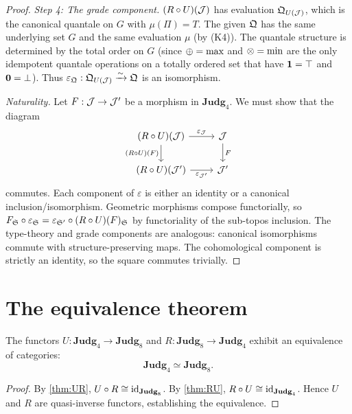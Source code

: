 \begin{proof}
\emph{Step 4: The grade component.}
$(R \circ U)(\mathcal{J})$ has evaluation $\mathfrak{Q}_{U(\mathcal{J})}$, which is the
canonical quantale on $G$ with $\mu(\Pi) = T$.  The given $\mathfrak{Q}$
has the same underlying set $G$ and the same evaluation $\mu$
(by (K4)).  The quantale structure is determined by the total
order on $G$ (since $\oplus = \max$ and $\otimes = \min$ are the only
idempotent quantale operations on a totally ordered set that have
$\mathbf{1} = \top$ and $\mathbf{0} = \bot$).  Thus
$\varepsilon_{\mathfrak{Q}} : \mathfrak{Q}_{U(\mathcal{J})} \xrightarrow{\sim} \mathfrak{Q}$
is an isomorphism.

\emph{Naturality.}  Let $F : \mathcal{J} \to \mathcal{J}'$ be a morphism in
$\mathbf{Judg}_4$.  We must show that the diagram
\[
\begin{tikzcd}
  (R \circ U)(\JJ) \ar[r, "\varepsilon_\JJ"]
    \ar[d, "(R \circ U)(F)"'] &
  \JJ \ar[d, "F"] \\
  (R \circ U)(\JJ') \ar[r, "\varepsilon_{\JJ'}"'] &
  \JJ'
\end{tikzcd}
\]
commutes.  Each component of $\varepsilon$ is either an identity or a
canonical inclusion/isomorphism.  Geometric morphisms compose
functorially, so $F_{\mathfrak{S}} \circ \varepsilon_{\mathfrak{S}} =
\varepsilon_{\mathfrak{S}'} \circ (R \circ U)(F)_{\mathfrak{S}}$ by
functoriality of the sub-topos inclusion.  The type-theory and
grade components are analogous: canonical isomorphisms commute with
structure-preserving maps.  The cohomological component is strictly
an identity, so the square commutes trivially.
\end{proof}

\section{The equivalence theorem}
\label{sec:equiv-thm}

\begin{theorem}
\label{thm:equiv}
The functors $U : \mathbf{Judg}_4 \to \mathbf{Judg}_8$ and
$R : \mathbf{Judg}_8 \to \mathbf{Judg}_4$ exhibit an equivalence
of categories:
\[
  \mathbf{Judg}_4 \simeq \mathbf{Judg}_8.
\]
\end{theorem}

\begin{proof}
By \cref{thm:UR}, $U \circ R \cong \mathrm{id}_{\mathbf{Judg}_8}$.
By \cref{thm:RU}, $R \circ U \cong \mathrm{id}_{\mathbf{Judg}_4}$.
Hence $U$ and $R$ are quasi-inverse functors, establishing the
equivalence.
\end{proof}

